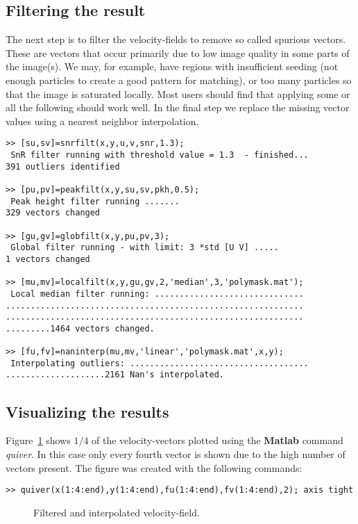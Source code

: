 \documentclass{book}
\begin{document}
\subsection{Filtering the result}

The next step is to filter the velocity-fields to remove so called
spurious vectors. These are vectors that occur primarily due to low
image quality in some parts of the image(s). We may, for example, have
regions with insufficient seeding (not enough particles to create a good
pattern for matching), or too many particles so that the image is
saturated locally. Most users should find that applying some or all the
following should work well. In the final step we replace the missing
vector values using a nearest neighbor interpolation.

\begin{verbatim}
>> [su,sv]=snrfilt(x,y,u,v,snr,1.3);
 SnR filter running with threshold value = 1.3  - finished... 
391 outliers identified

>> [pu,pv]=peakfilt(x,y,su,sv,pkh,0.5);
 Peak height filter running ....... 
329 vectors changed 

>> [gu,gv]=globfilt(x,y,pu,pv,3);
 Global filter running - with limit: 3 *std [U V] ..... 
1 vectors changed

>> [mu,mv]=localfilt(x,y,gu,gv,2,'median',3,'polymask.mat');
 Local median filter running: ..............................
............................................................
............................................................
.........1464 vectors changed.

>> [fu,fv]=naninterp(mu,mv,'linear','polymask.mat',x,y);
 Interpolating outliers: ....................................
....................2161 Nan's interpolated.
\end{verbatim}

\subsection{Visualizing the results}
Figure~\ref{fig:velo} shows $1/4$ of the velocity-vectors plotted using
the {\bf Matlab} command {\em quiver}. In this case only every fourth
vector is shown due to the high number of vectors present. The figure
was created with the following commands:
\begin{verbatim}
>> quiver(x(1:4:end),y(1:4:end),fu(1:4:end),fv(1:4:end),2); axis tight
\end{verbatim}

\begin{figure}
\begin{center} 
{}
\end{center}
\caption{Filtered and interpolated velocity-field.}\label{fig:velo}
\end{figure}
\end{document}
